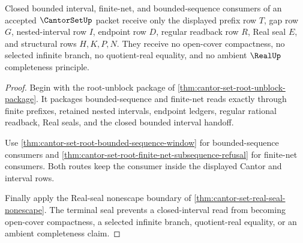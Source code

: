 \begin{theorem}
\label{thm:cantor-set-closed-interval-nonescape}
Closed bounded interval, finite-net, and bounded-sequence consumers of an accepted $\CantorSetUp$ packet receive only the displayed prefix row $T$, gap row $G$, nested-interval row $I$, endpoint row $D$, regular readback row $R$, Real seal $E$, and structural rows $H,K,P,N$. They receive no open-cover compactness, no selected infinite branch, no quotient-real equality, and no ambient $\RealUp$ completeness principle.
\end{theorem}
\begin{proof}
Begin with the root-unblock package of \autoref{thm:cantor-set-root-unblock-package}. It packages bounded-sequence and finite-net reads exactly through finite prefixes, retained nested intervals, endpoint ledgers, regular rational readback, Real seals, and the closed bounded interval handoff.

Use \autoref{thm:cantor-set-root-bounded-sequence-window} for bounded-sequence consumers and \autoref{thm:cantor-set-root-finite-net-subsequence-refusal} for finite-net consumers. Both routes keep the consumer inside the displayed Cantor and interval rows.

Finally apply the Real-seal nonescape boundary of \autoref{thm:cantor-set-real-seal-nonescape}. The terminal seal prevents a closed-interval read from becoming open-cover compactness, a selected infinite branch, quotient-real equality, or an ambient completeness claim.
\end{proof}

